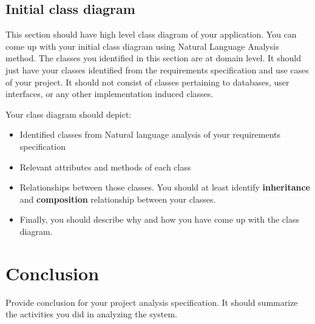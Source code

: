
\subsection{Initial class diagram} %
\label{sub:initial_class_diagram}

This section should have high level class diagram of your application. You can come up with your initial class diagram using Natural Language Analysis method. The classes you identified in this section are at domain level. It should just have your classes identified from the requirements specification and use cases of your project. It should not consist of classes pertaining to databases, user interfaces, or any other implementation induced classes.

Your class diagram should depict:

\begin{itemize}
	\item Identified classes from Natural language analysis of your requirements specification
	\item Relevant attributes and methods of each class
	\item Relationships between those classes. You should at least identify \textbf{inheritance} and \textbf{composition} relationship between your classes.
	\item Finally, you should describe why and how you have come up with the class diagram.
\end{itemize}


\section{Conclusion} %
Provide conclusion for your project analysis specification. It should summarize the activities you did in analyzing the system.
